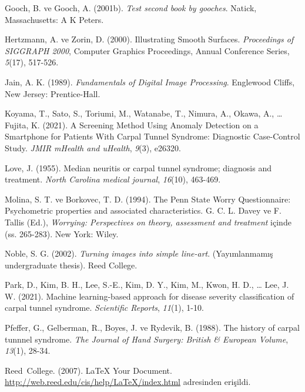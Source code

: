 \documentclass[12pt,twoside]{deuthesis}
\begin{document}
\begin{CSLReferences}{1}{0}
\leavevmode{}%
Gooch, B. ve Gooch, A. (2001b). \emph{Test second book by gooches}. Natick, Massachusetts: A K Peters.

\leavevmode{}%
Hertzmann, A. ve Zorin, D. (2000). Illustrating Smooth Surfaces. \emph{Proceedings of SIGGRAPH 2000}, Computer Graphics Proceedings, Annual Conference Series, \emph{5}(17), 517-526.

\leavevmode{}%
Jain, A. K. (1989). \emph{Fundamentals of Digital Image Processing}. Englewood Cliffs, New Jersey: Prentice-Hall.

\leavevmode{}%
Koyama, T., Sato, S., Toriumi, M., Watanabe, T., Nimura, A., Okawa, A., \ldots{} Fujita, K. (2021). A Screening Method Using Anomaly Detection on a Smartphone for Patients With Carpal Tunnel Syndrome: Diagnostic Case-Control Study. \emph{JMIR mHealth and uHealth}, \emph{9}(3), e26320.

\leavevmode{}%
Love, J. (1955). Median neuritis or carpal tunnel syndrome; diagnosis and treatment. \emph{North Carolina medical journal}, \emph{16}(10), 463-469.

\leavevmode{}%
Molina, S. T. ve Borkovec, T. D. (1994). The {P}enn {S}tate Worry Questionnaire: Psychometric properties and associated characteristics. G. C. L. Davey ve F. Tallis (Ed.), \emph{Worrying: Perspectives on theory, assessment and treatment} içinde (ss. 265-283). New York: Wiley.

\leavevmode{}%
Noble, S. G. (2002). \emph{Turning images into simple line-art}. (Yayımlanmamış undergraduate thesis). Reed College.

\leavevmode{}%
Park, D., Kim, B. H., Lee, S.-E., Kim, D. Y., Kim, M., Kwon, H. D., \ldots{} Lee, J. W. (2021). Machine learning-based approach for disease severity classification of carpal tunnel syndrome. \emph{Scientific Reports}, \emph{11}(1), 1-10.

\leavevmode{}%
Pfeffer, G., Gelberman, R., Boyes, J. ve Rydevik, B. (1988). The history of carpal tunnnel syndrome. \emph{The Journal of Hand Surgery: British \& European Volume}, \emph{13}(1), 28-34.

\leavevmode{}%
Reed~College. (2007). LaTeX Your Document. \url{http://web.reed.edu/cis/help/LaTeX/index.html} adresinden erişildi.


\end{CSLReferences}
\end{document}
